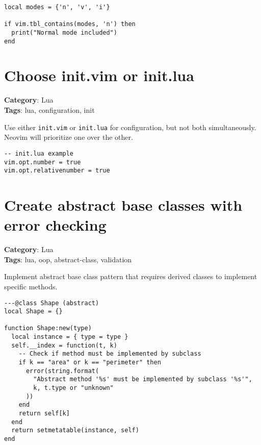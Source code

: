 {{{{{{\begin{Exa*}{}
\begin{Verbatim}[fontsize=\footnotesize, breaklines, breakanywhere]
local modes = {'n', 'v', 'i'}

if vim.tbl_contains(modes, 'n') then
  print("Normal mode included")
end
\end{Verbatim}
\end{Exa*}

\section{Choose init.vim or init.lua}

\textbf{Category}: Lua\\ \textbf{Tags}: lua, configuration, init
\vspace{0.5cm}

Use either {\footnotesize \Verb§init.vim§} or {\footnotesize \Verb§init.lua§} for configuration, but not both simultaneously. Neovim will prioritize one over the other.

\begin{Exa*}{}
\begin{Verbatim}[fontsize=\footnotesize, breaklines, breakanywhere]
-- init.lua example
vim.opt.number = true
vim.opt.relativenumber = true
\end{Verbatim}
\end{Exa*}

\section{Create abstract base classes with error checking}

\textbf{Category}: Lua\\ \textbf{Tags}: lua, oop, abstract-class, validation
\vspace{0.5cm}

Implement abstract base class pattern that requires derived classes to implement specific methods.

\begin{Exa*}{}
\begin{Verbatim}[fontsize=\footnotesize, breaklines, breakanywhere]
---@class Shape (abstract)
local Shape = {}

function Shape:new(type)
  local instance = { type = type }
  self.__index = function(t, k)
    -- Check if method must be implemented by subclass
    if k == "area" or k == "perimeter" then
      error(string.format(
        "Abstract method '%s' must be implemented by subclass '%s'",
        k, t.type or "unknown"
      ))
    end
    return self[k]
  end
  return setmetatable(instance, self)
end


\end{Verbatim}
\end{Exa*}}}}}}}
